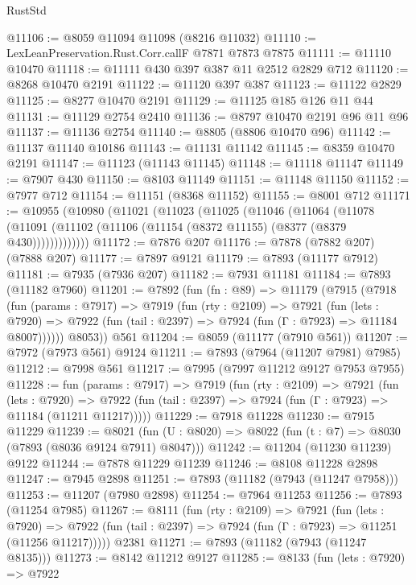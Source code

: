 \begin{lexlean}{RustStd}
\begin{coremodule}
{\begin{coremodule}
{{{{{{{{{{{{{{{{{{{{{{{{{{{{{{{{{{{{{{{{{{{{{{{{{{@11106 := @8059 @11094 @11098 (@8216 @11032)
@11110 := LexLeanPreservation.Rust.Corr.callF @7871 @7873 @7875
@11111 := @11110 @10470
@11118 := @11111 @430 @397 @387 @11 @2512 @2829 @712
@11120 := @8268 @10470 @2191
@11122 := @11120 @397 @387
@11123 := @11122 @2829
@11125 := @8277 @10470 @2191
@11129 := @11125 @185 @126 @11 @44
@11131 := @11129 @2754 @2410
@11136 := @8797 @10470 @2191 @96 @11 @96
@11137 := @11136 @2754
@11140 := @8805 (@8806 @10470 @96)
@11142 := @11137 @11140 @10186
@11143 := @11131 @11142
@11145 := @8359 @10470 @2191
@11147 := @11123 (@11143 @11145)
@11148 := @11118 @11147
@11149 := @7907 @430
@11150 := @8103 @11149
@11151 := @11148 @11150
@11152 := @7977 @712
@11154 := @11151 (@8368 @11152)
@11155 := @8001 @712
@11171 := @10955
    (@10980
      (@11021
        (@11023
          (@11025
            (@11046
              (@11064
                (@11078
                  (@11091 (@11102 (@11106 (@11154 (@8372 @11155) (@8377 (@8379 @430)))))))))))))
@11172 := @7876 @207
@11176 := @7878 (@7882 @207) (@7888 @207)
@11177 := @7897 @9121
@11179 := @7893 (@11177 @7912)
@11181 := @7935 (@7936 @207)
@11182 := @7931 @11181
@11184 := @7893 (@11182 @7960)
@11201 := @7892
    (fun (fn : @89) =>
    @11179
      (@7915
        (@7918
          (fun (params : @7917) =>
          @7919
            (fun (rty : @2109) =>
            @7921
              (fun (lets : @7920) =>
              @7922 (fun (tail : @2397) => @7924 (fun (Γ : @7923) => @11184 @8007))))))
        @8053))
    @561
@11204 := @8059 (@11177 (@7910 @561))
@11207 := @7972 (@7973 @561) @9124
@11211 := @7893 (@7964 (@11207 @7981) @7985)
@11212 := @7998 @561
@11217 := @7995 (@7997 @11212 @9127 @7953 @7955)
@11228 := fun (params : @7917) =>
  @7919
    (fun (rty : @2109) =>
    @7921
      (fun (lets : @7920) =>
      @7922 (fun (tail : @2397) => @7924 (fun (Γ : @7923) => @11184 (@11211 @11217)))))
@11229 := @7918 @11228
@11230 := @7915 @11229
@11239 := @8021 (fun (U : @8020) => @8022 (fun (t : @7) => @8030 (@7893 (@8036 @9124 @7911) @8047)))
@11242 := @11204 (@11230 @11239) @9122
@11244 := @7878 @11229 @11239
@11246 := @8108 @11228 @2898
@11247 := @7945 @2898
@11251 := @7893 (@11182 (@7943 (@11247 @7958)))
@11253 := @11207 (@7980 @2898)
@11254 := @7964 @11253
@11256 := @7893 (@11254 @7985)
@11267 := @8111
    (fun (rty : @2109) =>
    @7921
      (fun (lets : @7920) =>
      @7922 (fun (tail : @2397) => @7924 (fun (Γ : @7923) => @11251 (@11256 @11217)))))
    @2381
@11271 := @7893 (@11182 (@7943 (@11247 @8135)))
@11273 := @8142 @11212 @9127
@11285 := @8133
    (fun (lets : @7920) =>
    @7922
}}}}}}}}}}}}}}}}}}}}}}}}}}}}}}}}}}}}}}}}}}}}}}}}}}
\end{coremodule}}
\end{coremodule}
\end{lexlean}
